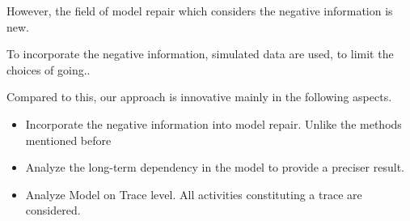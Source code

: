 However, the field of model repair which considers the negative information is new. 

To incorporate the negative information, simulated data are used, to limit the choices of going..

Compared to this, our approach is innovative mainly in the following aspects. 
\begin{itemize}
	\item Incorporate the negative information into model repair. Unlike the methods mentioned before
	\item Analyze the long-term dependency in the model to provide a preciser result. 
	\item Analyze Model on Trace level. All activities constituting a trace are considered. 
\end{itemize}